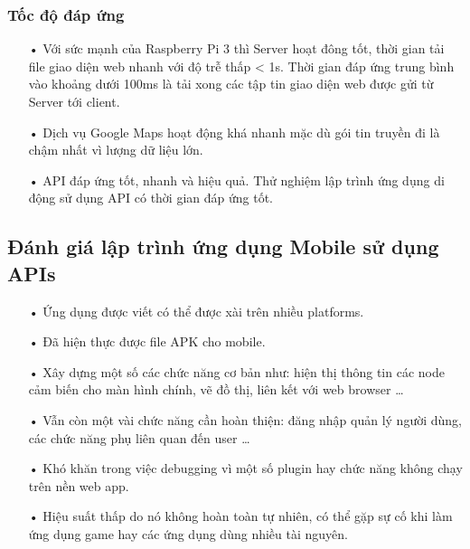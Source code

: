 \subsubsection*{Tốc độ đáp ứng}
\begin{itemize}
	\item[•] Với sức mạnh của Raspberry Pi 3 thì Server hoạt đông tốt, thời gian tải file giao diện web nhanh với độ trễ thấp < 1s. Thời gian đáp ứng trung bình vào khoảng dưới 100ms là tải xong các tập tin giao diện web được gửi từ Server tới client.
	\item[•] Dịch vụ Google Maps hoạt động khá nhanh mặc dù gói tin truyền đi là chậm nhất vì lượng dữ liệu lớn.
	\item[•] API đáp ứng tốt, nhanh và hiệu quả. Thử nghiệm lập trình ứng dụng di động sử dụng API có thời gian đáp ứng tốt.
\end{itemize}

\subsection{Đánh giá lập trình ứng dụng Mobile sử dụng APIs}
\begin{itemize}
\item[•]Ứng dụng được viết có thể được xài trên nhiều platforms.
\item[•]Đã hiện thực được file APK cho mobile.
\item[•]Xây dựng một số các chức năng cơ bản như: hiện thị thông tin các node cảm biến cho màn hình chính, vẽ đồ thị, liên kết với web browser …
\item[•] Vẫn còn một vài chức năng cần hoàn thiện: đăng nhập quản lý người dùng, các chức năng phụ liên quan đến user …
\item[•] Khó khăn trong việc debugging vì một số plugin hay chức năng không chạy trên nền web app. 
\item[•]Hiệu suất thấp do nó không hoàn toàn tự nhiên, có thể gặp sự cố khi làm ứng dụng game hay các ứng dụng dùng nhiều tài nguyên.

\end{itemize}
